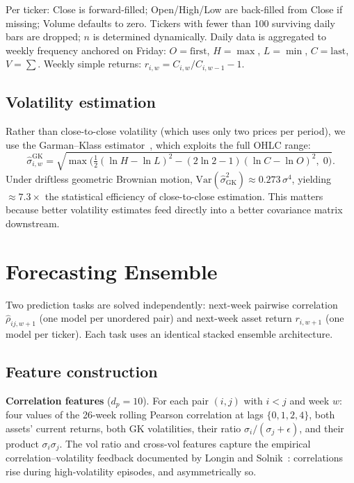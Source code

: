\documentclass[10pt,twocolumn]{article}
\newcommand{\Var}{\mathrm{Var}}
\begin{document}
Per ticker: Close is forward-filled; Open/High/Low are
back-filled from Close if missing; Volume defaults to zero.
Tickers with fewer than 100 surviving daily bars are dropped;
$n$ is determined dynamically.  Daily data is aggregated to
weekly frequency anchored on Friday:
$O=\text{first}$, $H=\max$, $L=\min$, $C=\text{last}$,
$V=\sum$.  Weekly simple returns:
$r_{i,w}=C_{i,w}/C_{i,w-1}-1$.

\subsection{Volatility estimation}

Rather than close-to-close volatility (which uses only two
prices per period), we use the Garman--Klass
estimator~\cite{garman1980}, which exploits the full OHLC range:
\begin{equation}\label{eq:gk}
\hat\sigma_{i,w}^{\mathrm{GK}} = \sqrt{\max\!\Big(
  \tfrac{1}{2}(\ln H{-}\ln L)^2
  - (2\ln 2{-}1)(\ln C{-}\ln O)^2,\;0\Big)}.
\end{equation}
Under driftless geometric Brownian motion,
$\Var(\hat\sigma_{\mathrm{GK}}^2)\approx 0.273\,\sigma^4$,
yielding $\approx 7.3\times$ the statistical efficiency of
close-to-close estimation.  This matters because better
volatility estimates feed directly into a better covariance
matrix downstream.

\FloatBarrier
\section{Forecasting Ensemble}\label{sec:ensemble}

Two prediction tasks are solved independently: next-week pairwise
correlation $\hat\rho_{ij,w+1}$ (one model per unordered pair) and
next-week asset return $r_{i,w+1}$ (one model per ticker).
Each task uses an identical stacked ensemble architecture.

\subsection{Feature construction}

\textbf{Correlation features} ($d_p=10$).
For each pair $(i,j)$ with $i<j$ and week $w$: four values of the
26-week rolling Pearson correlation at lags $\{0,1,2,4\}$, both
assets' current returns, both GK volatilities, their ratio
$\sigma_i/(\sigma_j+\epsilon)$, and their product $\sigma_i\sigma_j$.
The vol ratio and cross-vol features capture the empirical
correlation--volatility feedback documented by
Longin and Solnik~\cite{longin2001}: correlations rise during
high-volatility episodes, and asymmetrically so.
\end{document}
